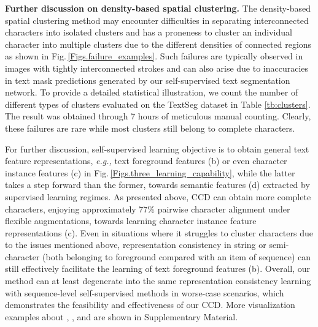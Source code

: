 \documentclass[10pt,twocolumn,letterpaper]{article}
\begin{document}
\begin{table}[t]
  \centering
  \caption{}
  \label{tb:clusters}
  \end{table}
  
\noindent \textbf{Further discussion on density-based spatial clustering.}
The density-based spatial clustering method may encounter difficulties in separating interconnected characters into isolated clusters and has a proneness to cluster an individual character into multiple clusters due to the different densities of connected regions as shown in Fig.\,\ref{Figs.failure_examples}. Such failures are typically observed in images with tightly interconnected strokes and can also arise due to inaccuracies in text mask predictions generated by our self-supervised text segmentation network. To provide a detailed statistical illustration, we count the number of different types of clusters evaluated on the TextSeg dataset in Table \ref{tb:clusters}. The result was obtained through 7 hours of meticulous manual counting. Clearly, these failures are rare while most clusters still belong to complete characters.

For further discussion, self-supervised learning objective is to obtain general text feature representations, \emph{e.g.,} text foreground features (b) or even character instance features (c) in Fig.\,\ref{Figs.three_learning_capability}, while the latter takes a step forward than the former, towards semantic features (d) extracted by supervised learning regimes. 
As presented above, CCD can obtain more complete characters, enjoying approximately 77\% pairwise character alignment under flexible augmentations, towards learning character instance feature representations (c). 
Even in situations where it struggles to cluster characters due to the issues mentioned above, representation consistency in string or semi-character (both belonging to foreground compared with an item of sequence) can still effectively facilitate the learning of text foreground features (b). 
Overall, our method can at least degenerate into the same representation consistency learning with sequence-level self-supervised methods in worse-case scenarios, which demonstrates the feasibility and effectiveness of our CCD. 
More visualization examples about , , and  are shown in Supplementary Material.
\end{document}
